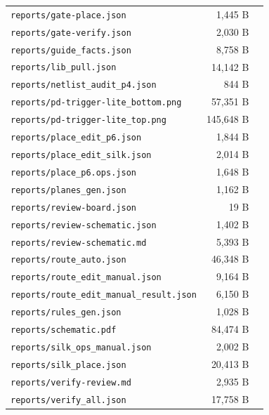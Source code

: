 \documentclass[11pt,a4paper]{article}
\begin{document}
{\begin{longtable}{p{9cm}rp{4cm}}
\texttt{reports/gate-place.json} & 1,445 B &  \\
\texttt{reports/gate-verify.json} & 2,030 B &  \\
\texttt{reports/guide\_facts.json} & 8,758 B &  \\
\texttt{reports/lib\_pull.json} & 14,142 B &  \\
\texttt{reports/netlist\_audit\_p4.json} & 844 B &  \\
\texttt{reports/pd-trigger-lite\_bottom.png} & 57,351 B &  \\
\texttt{reports/pd-trigger-lite\_top.png} & 145,648 B &  \\
\texttt{reports/place\_edit\_p6.json} & 1,844 B &  \\
\texttt{reports/place\_edit\_silk.json} & 2,014 B &  \\
\texttt{reports/place\_p6.ops.json} & 1,648 B &  \\
\texttt{reports/planes\_gen.json} & 1,162 B &  \\
\texttt{reports/review-board.json} & 19 B &  \\
\texttt{reports/review-schematic.json} & 1,402 B &  \\
\texttt{reports/review-schematic.md} & 5,393 B &  \\
\texttt{reports/route\_auto.json} & 46,348 B &  \\
\texttt{reports/route\_edit\_manual.json} & 9,164 B &  \\
\texttt{reports/route\_edit\_manual\_result.json} & 6,150 B &  \\
\texttt{reports/rules\_gen.json} & 1,028 B &  \\
\texttt{reports/schematic.pdf} & 84,474 B &  \\
\texttt{reports/silk\_ops\_manual.json} & 2,002 B &  \\
\texttt{reports/silk\_place.json} & 20,413 B &  \\
\texttt{reports/verify-review.md} & 2,935 B &  \\
\texttt{reports/verify\_all.json} & 17,758 B &  \\
\bottomrule
\end{longtable}
}
\end{document}
